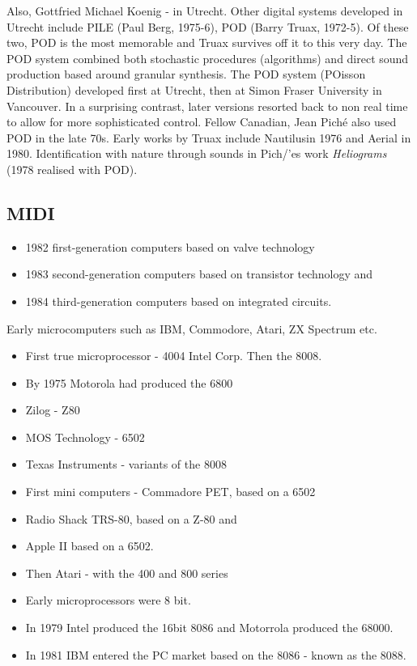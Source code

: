 Also, Gottfried Michael Koenig - in Utrecht.  Other digital systems developed in Utrecht include PILE (Paul Berg, 1975-6), POD  (Barry Truax,  1972-5).  Of these two, POD is the most memorable and Truax survives off it to this very day. The POD system combined both stochastic procedures (algorithms) and direct sound production based around granular synthesis. The POD system (POisson Distribution) developed first at Utrecht, then at Simon Fraser University in Vancouver. In a surprising contrast, later versions resorted back to non real time to allow for more sophisticated control.  Fellow Canadian, Jean Pich\'e also used POD in the late 70s. Early works by Truax include Nautilusin 1976 and Aerial in 1980. Identification with nature through sounds in Pich/'es work \textit{Heliograms} (1978 realised with POD).



\subsection{MIDI}
\begin{itemize}
\item 1982 first-generation computers based on valve technology
\item 1983 second-generation computers based on transistor technology and
\item 1984 third-generation computers based on integrated circuits.
\end{itemize}

Early microcomputers such as IBM, Commodore, Atari, ZX Spectrum etc.

\begin{itemize}
\item First true microprocessor - 4004 Intel Corp.  Then the 8008.
\item By 1975 Motorola had produced the 6800
\item Zilog - Z80
\item MOS Technology - 6502
\item Texas Instruments - variants of the 8008
\item First mini computers - Commadore PET, based on a 6502
\item Radio Shack TRS-80, based on a Z-80 and
\item Apple II based on a 6502.
\item Then Atari - with the 400 and 800 series
\item Early microprocessors were 8 bit.
\item In 1979 Intel produced the 16bit 8086 and Motorrola produced the 68000.
\item In 1981 IBM entered the PC market based on the 8086 - known as the 8088.
\end{itemize}

